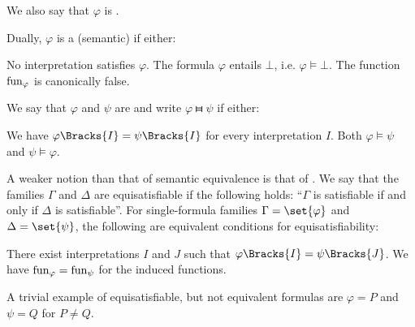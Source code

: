 \begin{definition}
\begin{thmenum}
    We also say that \( \varphi \) is .

     Dually, \( \varphi \) is a (semantic)  if either:
    \begin{itemize}
       No interpretation satisfies \( \varphi \).
       The formula \( \varphi \) entails \( \bot \), i.e. \( \varphi \vDash \bot \).
       The function \( \operatorname{fun}_\varphi \) is canonically false.
    \end{itemize}

     We say that \( \varphi \) and \( \psi \) are  and write \( \varphi \gleichstark \psi \) if either:
    \begin{itemize}
       We have \( \varphi\Bracks{I} = \psi\Bracks{I} \) for every interpretation \( I \).
       Both \( \varphi \vDash \psi \) and \( \psi \vDash \varphi \).
    \end{itemize}

     A weaker notion than that of semantic equivalence is that of . We say that the families \( \Gamma \) and \( \Delta \) are equisatisfiable if the following holds: \enquote{\( \Gamma \) is satisfiable if and only if \( \Delta \) is satisfiable}. For single-formula families \( \Gamma = \set{ \varphi } \) and \( \Delta = \set{ \psi } \), the following are equivalent conditions for equisatisfiability:
    \begin{itemize}
       There exist interpretations \( I \) and \( J \) such that \( \varphi\Bracks{I} = \psi\Bracks{J} \).
       We have \( \operatorname{fun}_\varphi = \operatorname{fun}_\psi \) for the induced functions.
    \end{itemize}

    A trivial example of equisatisfiable, but not equivalent formulas are \( \varphi = P \) and \( \psi = Q \) for \( P \neq Q \).
  \end{thmenum}
\end{definition}

